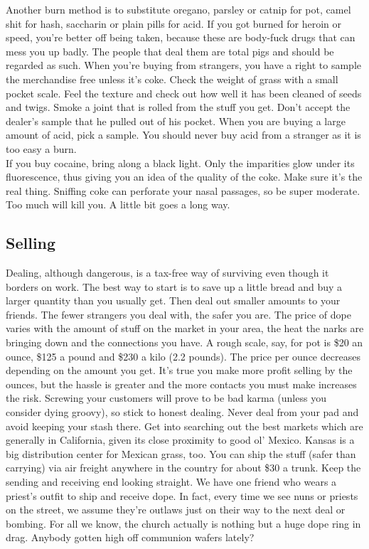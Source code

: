 \documentclass[11pt,twoside,a4paper]{book}
\begin{document}
Another burn method is to substitute oregano, parsley or catnip for pot, camel shit for hash, saccharin or plain pills for acid. If you got burned for heroin or speed, you're better off being taken, because these are body-fuck drugs that can mess you up badly. The people that deal them are total pigs and should be regarded as such.  When you're buying from strangers, you have a right to sample the merchandise free unless it's coke. Check the weight of grass with a small pocket scale. Feel the texture and check out how well it has been cleaned of seeds and twigs. Smoke a joint that is rolled from the stuff you get. Don't accept the dealer's sample that he pulled out of his pocket. When you are buying a large amount of acid, pick a sample. You should never buy acid from a stranger as it is too easy a burn.~\\

If you buy cocaine, bring along a black light. Only the imparities glow under its fluorescence, thus giving you an idea of the quality of the coke. Make sure it's the real thing. Sniffing coke can perforate your nasal passages, so be super moderate. Too much will kill you. A little bit goes a long way.~\\

\subsection{Selling}

Dealing, although dangerous, is a tax-free way of surviving even though it borders on work. The best way to start is to save up a little bread and buy a larger quantity than you usually get. Then deal out smaller amounts to your friends. The fewer strangers you deal with, the safer you are. The price of dope varies with the amount of stuff on the market in your area, the heat the narks are bringing down and the connections you have. A rough scale, say, for pot is \$20 an ounce, \$125 a pound and \$230 a kilo (2.2 pounds). The price per ounce decreases depending on the amount you get. It's true you make more profit selling by the ounces, but the hassle is greater and the more contacts you must make increases the risk. Screwing your customers will prove to be bad karma (unless you consider dying groovy), so stick to honest dealing. Never deal from your pad and avoid keeping your stash there. Get into searching out the best markets which are generally in California, given its close proximity to good ol' Mexico. Kansas is a big distribution center for Mexican grass, too. You can ship the stuff (safer than carrying) via air freight anywhere in the country for about \$30 a trunk. Keep the sending and receiving end looking straight. We have one friend who wears a priest's outfit to ship and receive dope. In fact, every time we see nuns or priests on the street, we assume they're outlaws just on their way to the next deal or bombing. For all we know, the church actually is nothing but a huge dope ring in drag. Anybody gotten high off communion wafers lately?~\\
\end{document}

